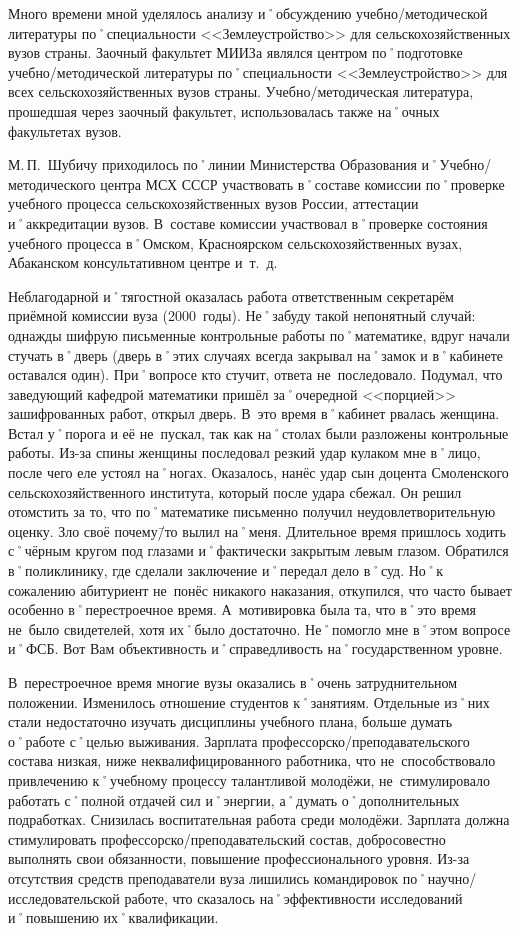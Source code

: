 Много времени мной уделялось анализу и˚обсуждению учебно\-/методической литературы по˚специальности <<Землеустройство>> для сельскохозяйственных вузов страны. Заочный факультет МИИЗа являлся центром по˚подготовке учебно\-/методической литературы по˚специальности <<Землеустройство>> для всех сельскохозяйственных вузов страны. Учебно\-/методическая литература, прошедшая через заочный факультет, использовалась также на˚очных факультетах вузов.

М.\,П.~Шубичу приходилось по˚линии Министерства Образования и˚Учебно\-/методического центра МСХ СССР участвовать в˚составе комиссии по˚проверке учебного процесса сельскохозяйственных вузов России, аттестации и˚аккредитации вузов. В~составе комиссии участвовал в˚проверке состояния учебного процесса в˚Омском, Красноярском сельскохозяйственных вузах, Абаканском консультативном центре и~т.~д.

Неблагодарной и˚тягостной оказалась работа ответственным секретарём приёмной комиссии вуза (2000~годы). Не˚забуду такой непонятный случай: однажды шифрую письменные контрольные работы по˚математике, вдруг начали стучать в˚дверь (дверь в˚этих случаях всегда закрывал на˚замок и в˚кабинете оставался один). При˚вопросе кто стучит, ответа не~последовало. Подумал, что заведующий кафедрой математики пришёл за˚очередной <<порцией>> зашифрованных работ, открыл дверь. В~это время в˚кабинет рвалась женщина. Встал у˚порога и её не~пускал, так как на˚столах были разложены контрольные работы. Из-за спины женщины последовал резкий удар кулаком мне в˚лицо, после чего еле устоял на˚ногах. Оказалось, нанёс удар сын доцента Смоленского сельскохозяйственного института, который после удара сбежал. Он решил отомстить за то, что по˚математике письменно получил неудовлетворительную оценку. Зло своё почему\=/то вылил на˚меня. Длительное время пришлось ходить с˚чёрным кругом под глазами и˚фактически закрытым левым глазом. Обратился в˚поликлинику, где сделали заключение и˚передал дело в˚суд. Но˚к сожалению абитуриент не~понёс никакого наказания, откупился, что часто бывает особенно в˚перестроечное время. А~мотивировка была та, что в˚это время не~было свидетелей, хотя их˚было достаточно. Не˚помогло мне в˚этом вопросе и˚ФСБ. Вот Вам объективность и˚справедливость на˚государственном уровне.

В~перестроечное время многие вузы оказались в˚очень затруднительном положении. Изменилось отношение студентов к˚занятиям. Отдельные из˚них стали недостаточно изучать дисциплины учебного плана, больше думать о˚работе с˚целью выживания. Зарплата профессорско\-/преподавательского состава низкая, ниже неквалифицированного работника, что не~способствовало привлечению к˚учебному процессу талантливой молодёжи, не~стимулировало работать с˚полной отдачей сил и˚энергии, а˚думать о˚дополнительных подработках. Снизилась воспитательная работа среди молодёжи. Зарплата должна стимулировать профессорско\-/преподавательский состав, добросовестно выполнять свои обязанности, повышение профессионального уровня. Из-за отсутствия средств преподаватели вуза лишились командировок по˚научно\-/исследовательской работе, что сказалось на˚эффективности исследований и˚повышению их˚квалификации. 

